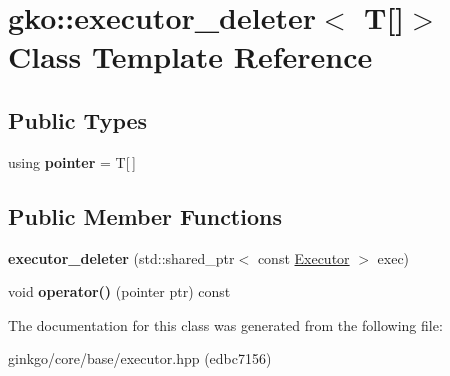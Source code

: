 \hypertarget{classgko_1_1executor__deleter_3_01T[]_4}{}\section{gko\+:\+:executor\+\_\+deleter$<$ T\mbox{[}\mbox{]}$>$ Class Template Reference}
\label{classgko_1_1executor__deleter_3_01T[]_4}
\subsection*{Public Types}
\begin{DoxyCompactItemize}
\item 
\mbox{\label{classgko_1_1executor__deleter_3_01T[]_4_ad28bfaa2f1d909bc11117a4889581a02}} 
using {\bfseries pointer} = T\mbox{[}$\,$\mbox{]}
\end{DoxyCompactItemize}
\subsection*{Public Member Functions}
\begin{DoxyCompactItemize}
\item 
\mbox{\label{classgko_1_1executor__deleter_3_01T[]_4_ab60279758e90bdcd14b076c55813d5be}} 
{\bfseries executor\+\_\+deleter} (std\+::shared\+\_\+ptr$<$ const \hyperlink{classgko_1_1Executor}{Executor} $>$ exec)
\item 
\mbox{\label{classgko_1_1executor__deleter_3_01T[]_4_a83f935eea2ed81964c8a018964c96934}} 
void {\bfseries operator()} (pointer ptr) const
\end{DoxyCompactItemize}


The documentation for this class was generated from the following file\+:\begin{DoxyCompactItemize}
\item 
ginkgo/core/base/executor.\+hpp (edbc7156)\end{DoxyCompactItemize}
